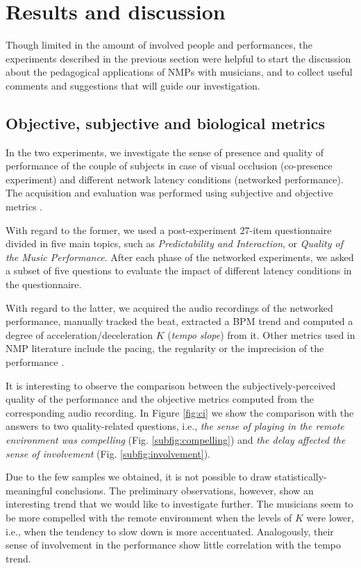 \documentclass[conference]{IEEEtran}
\begin{document}
\section{Results and discussion}\label{sec:discussion}
Though limited in the amount of involved people and performances, the experiments described in the previous section were helpful to start the discussion about the pedagogical applications of NMPs with musicians, and to collect useful comments and suggestions that will guide our investigation. 


\subsection{Objective, subjective and biological metrics}\label{subsec:metrics}
In the two experiments, we investigate the sense of presence and quality of performance of the couple of subjects in case of visual occlusion (co-presence experiment) and different network latency conditions (networked performance). The acquisition and evaluation was performed using subjective and objective metrics \cite{CIM2018}. 

With regard to the former, we used a post-experiment 27-item questionnaire divided in five main topics, such as \textit{Predictability and Interaction}, or \textit{Quality of the Music Performance}. After each phase of the networked experiments, we asked a subset of five questions to evaluate the impact of different latency conditions in the questionnaire.

With regard to the latter, we acquired the audio recordings of the networked performance, manually tracked the beat, extracted a BPM trend and computed a degree of acceleration/deceleration $K$  (\textit{tempo slope}) from it. Other metrics used in NMP literature include the pacing, the regularity or the imprecision of the performance \cite{RottondiOverview}.

It is interesting to observe the comparison between the subjectively-perceived quality of the performance and the  objective metrics computed from the corresponding audio recording. In Figure \ref{fig:ci} we show the comparison with the answers to two quality-related questions, i.e., \textit{the sense of playing in the remote environment was compelling} (Fig. \ref{subfig:compelling}) and \textit{the delay affected the sense of involvement} (Fig. \ref{subfig:involvement}).

Due to the few samples we obtained, it is not possible to draw statistically-meaningful conclusions. The preliminary observations, however, show an interesting trend that we would like to investigate further. The musicians seem to be more compelled with the remote environment when the levels of $K$ were lower, i.e., when the tendency to slow down is more accentuated. Analogously, their sense of involvement in the performance show little correlation with the tempo trend. 
\end{document}
